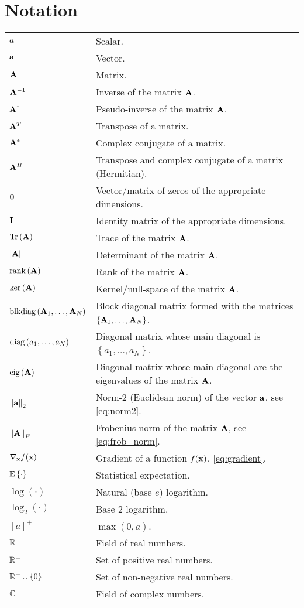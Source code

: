 \chapter*{Notation}

{ %
\renewcommand{\arraystretch}{1.5}

\begin{longtabu} to \textwidth {lX}
$a$ & Scalar. \\
$\aa$ & Vector. \\
$\AA$ & Matrix. \\
$\AA^{-1}$ & Inverse of the matrix $\AA$. \\
$\AA^\dagger$ & Pseudo-inverse of the matrix $\AA$. \\
$\AA^T$ & Transpose of a matrix. \\
$\AA^\ast$ & Complex conjugate of a matrix. \\
$\AA^H$ & Transpose and complex conjugate of a matrix
    (Hermitian). \\
$\zero$ & Vector/matrix of zeros of the appropriate dimensions. \\
$\eye$ & Identity matrix of the appropriate dimensions. \\

$\Tr\left(\AA\right)$ & Trace of the matrix $\AA$. \\
$\left|\AA\right|$ & Determinant of the matrix $\AA$. \\
$\rank\left(\AA\right)$ & Rank of the matrix $\AA$. \\
$\ker\left(\AA\right)$ & Kernel/null-space of the matrix $\AA$. \\
$\blkdiag\left(\AA_1, \ldots, \AA_N\right)$ & Block diagonal matrix
    formed with the matrices $\left\{\AA_1, \ldots, \AA_N\right\}$. \\
$\diag\left(a_1, \ldots, a_N\right)$ & Diagonal matrix whose main
    diagonal is $\left\{a_1, \ldots, a_N\right\}$. \\
$\text{eig}\left(\AA\right)$ & Diagonal matrix whose main diagonal are the
    eigenvalues of the matrix $\AA$. \\
$\left\|\aa\right\|_2$ & Norm-2 (Euclidean norm) of the vector $\aa$, see
    \eqref{eq:norm2}. \\
$\left\|\AA\right\|_F$ & Frobenius norm of the matrix $\AA$, see
    \eqref{eq:frob_norm}. \\
$\nablabf_{\xx}f(\xx)$ & Gradient of a function $f(\xx)$,
    \eqref{eq:gradient}. \\
$\E\left\{\cdot\right\}$ & Statistical expectation. \\
$\log\left(\cdot\right)$ & Natural (base $e$) logarithm. \\
$\log_2\left(\cdot\right)$ & Base 2 logarithm. \\
$\left[ a \right]^+$ & $\max\left( 0,a \right)$. \\
$\R$ & Field of real numbers. \\
$\R^+$ & Set of positive real numbers. \\
$\R^+ \cup \left\{0\right\}$ & Set of non-negative real numbers. \\
$\C$ & Field of complex numbers.
\end{longtabu}
}
